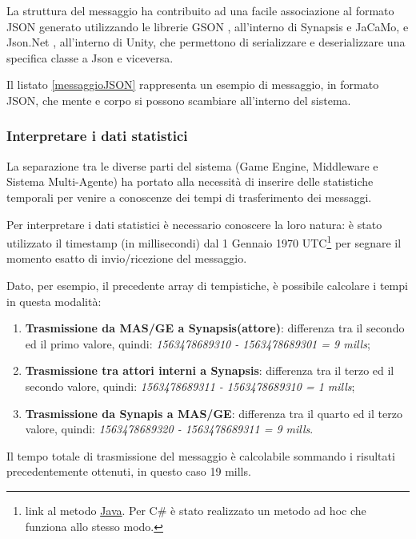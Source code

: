 La struttura del messaggio ha contribuito ad una facile associazione al formato JSON \cite{json} generato utilizzando le librerie GSON \cite{gson}, all'interno di Synapsis e JaCaMo, e Json.Net \cite{json_net}, all'interno di Unity, che permettono di serializzare e deserializzare una specifica classe a Json e viceversa.



Il listato \ref{messaggioJSON} rappresenta un esempio di messaggio, in formato JSON, che mente e corpo si possono scambiare all'interno del sistema.

\subsubsection{Interpretare i dati statistici}

La separazione tra le diverse parti del sistema (Game Engine, Middleware e Sistema Multi-Agente) ha portato alla necessità di inserire delle statistiche temporali per venire a conoscenze dei tempi di trasferimento dei messaggi.

\medskip

Per interpretare i dati statistici è necessario conoscere la loro natura: è stato utilizzato il timestamp (in millisecondi) dal 1 Gennaio 1970 UTC\footnote{link al metodo \href{https://docs.oracle.com/en/java/javase/12/docs/api/java.base/java/lang/System.html}{Java}. Per C\# è stato realizzato un metodo ad hoc che funziona allo stesso modo.} per segnare il momento esatto di invio/ricezione del messaggio.

\medskip

Dato, per esempio, il precedente array di tempistiche, è possibile calcolare i tempi in questa modalità:

\begin{enumerate}
    \item \textbf{Trasmissione da MAS/GE a Synapsis(attore)}: differenza tra il secondo ed il primo valore, quindi: \textit{1563478689310 - 1563478689301 = 9 mills};
    \item \textbf{Trasmissione tra attori interni a Synapsis}: differenza tra il terzo ed il secondo valore, quindi: \textit{1563478689311 - 1563478689310 = 1 mills};
    \item \textbf{Trasmissione da Synapis a MAS/GE}: differenza tra il quarto ed il terzo valore, quindi: \textit{1563478689320 - 1563478689311 = 9 mills}.
\end{enumerate}

Il tempo totale di trasmissione del messaggio è calcolabile sommando i risultati precedentemente ottenuti, in questo caso 19 mills.